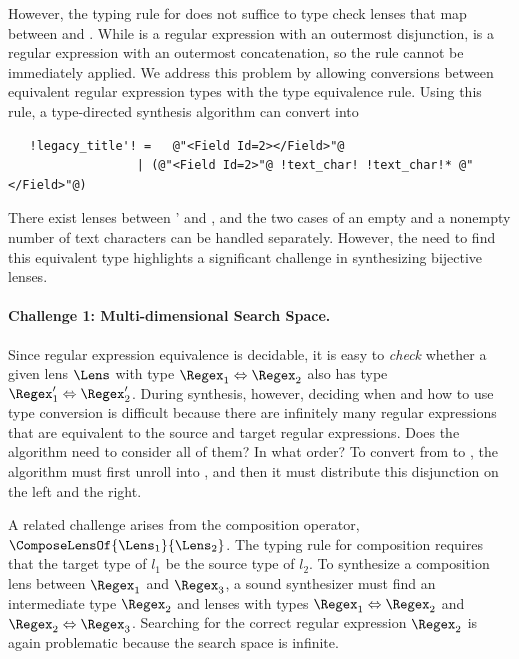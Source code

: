 \documentclass[acmsmall,screen]{acmart}
\begin{document}
However, the typing rule for \OrLens{} does not suffice to type check lenses
that map between \LegacyTitle{} and \ModernTitle{}.  While
 is a regular expression with an
outermost disjunction, 
is a regular expression with an outermost concatenation, so the rule cannot be
immediately applied.
We address this problem by allowing conversions between equivalent
regular expression types with the type equivalence rule.
Using this rule, a type-directed synthesis algorithm can convert
\LegacyTitle{} into
%
\begin{lstlisting}
   !legacy_title'! =   @"<Field Id=2></Field>"@
                  | (@"<Field Id=2>"@ !text_char! !text_char!* @"</Field>"@)
\end{lstlisting}
%
There exist \OrLens{} lenses between \LegacyTitle{}' and \ModernTitle{}, and the two cases of an empty
and a nonempty number of text characters can be handled separately.  However,
the need to find this equivalent type highlights a significant challenge in
synthesizing bijective lenses.

\paragraph*{Challenge 1: Multi-dimensional Search Space.}
Since regular expression equivalence is decidable, 
it is easy to \emph{check} whether a given lens $\Lens$ with type 
$\Regex_1 \Leftrightarrow \Regex_2$
also has type 
$\Regex_1' \Leftrightarrow \Regex_2'$. 
%
During synthesis, however, deciding when and how to use type conversion is
difficult because there are infinitely many regular expressions that are
equivalent to the source and target regular expressions.  Does the algorithm
need to consider all of them?  In what order?  To convert from
 to ,
the algorithm must first unroll  into
, and then it must
distribute this disjunction on the left and the right.

A related challenge arises from the composition operator,
$\ComposeLensOf{\Lens_1}{\Lens_2}$.  The typing rule for composition
requires that the target type of $l_1$ be the source
type of $l_2$.  To synthesize a composition lens between
$\Regex_1$ and $\Regex_3$, a sound synthesizer must find an intermediate type
$\Regex_2$ and lenses with types $\Regex_1 \Leftrightarrow \Regex_2$ and
$\Regex_2 \Leftrightarrow \Regex_3$.  Searching for the correct
regular expression $\Regex_2$ is again problematic because
the search space is infinite.   
\end{document}
